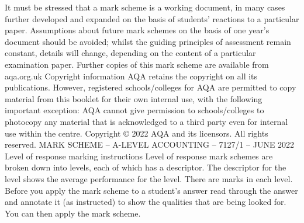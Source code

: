 \documentclass{article}
\begin{document}
It must be stressed that a mark scheme is a working document, in many cases further developed and \newline
expanded on the basis of students’ reactions to a particular paper.  Assumptions about future mark \newline
schemes on the basis of one year’s document should be avoided; whilst the guiding principles of \newline
assessment remain constant, details will change, depending on the content of a particular examination \newline
paper. \newline
 \newline
 \newline
Further copies of this mark scheme are available from aqa.org.uk \newline
 \newline
   \newline
 \newline
Copyright information  \newline
 \newline
AQA retains the copyright on all its publications.  However, registered schools/colleges for AQA are permitted to copy material from this booklet for their own \newline
internal use, with the following important exception: AQA cannot give permission to schools/colleges to photocopy any material that is acknowledged to a third \newline
party even for internal use within the centre.  \newline
 \newline
Copyright © 2022 AQA and its licensors.  All rights reserved.  \newline
MARK SCHEME – A-LEVEL ACCOUNTING – 7127/1 – JUNE 2022  \newline
Level of response marking instructions \newline
 \newline
Level of response mark schemes are broken down into levels, each of which has a descriptor.  The \newline
descriptor for the level shows the average performance for the level.  There are marks in each level. \newline
 \newline
Before you apply the mark scheme to a student’s answer read through the answer and annotate it (as \newline
instructed) to show the qualities that are being looked for.  You can then apply the mark scheme. \newline
\end{document}
